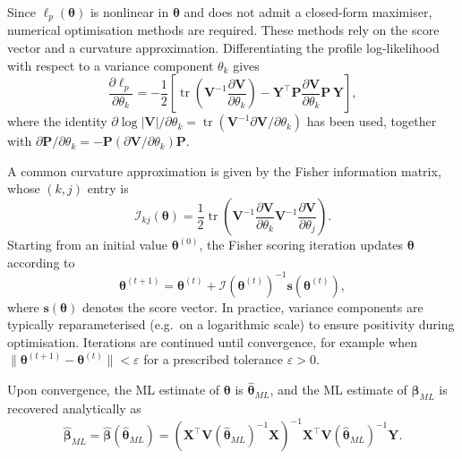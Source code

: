 \documentclass[
  letterpaper,
  DIV=11,
  numbers=noendperiod]{scrartcl}
\begin{document}
Since \(\ell_p(\symbf{\theta})\) is nonlinear in \(\symbf{\theta}\) and
does not admit a closed-form maximiser, numerical optimisation methods
are required. These methods rely on the score vector and a curvature
approximation. Differentiating the profile log-likelihood with respect
to a variance component \(\theta_k\) gives \begin{equation}
\frac{\partial \ell_p}{\partial \theta_k}
=
-\frac{1}{2}\left[
\operatorname{tr}\!\left(
\symbf{V}^{-1}\frac{\partial \symbf{V}}{\partial \theta_k}
\right)
-
\symbf{Y}^\top \symbf{P}
\frac{\partial \symbf{V}}{\partial \theta_k}
\symbf{P}\,\symbf{Y}
\right],
\end{equation} where the identity
\(\partial \log|\symbf{V}|/\partial \theta_k
=
\operatorname{tr}(\symbf{V}^{-1}\partial \symbf{V}/\partial \theta_k)\)
has been used, together with \(\partial \symbf{P}/\partial \theta_k
=
-\symbf{P}(\partial \symbf{V}/\partial \theta_k)\symbf{P}\).

A common curvature approximation is given by the Fisher information
matrix, whose \((k,j)\) entry is \begin{equation}
\mathcal{I}_{kj}(\symbf{\theta})
=
\frac{1}{2}\operatorname{tr}\!\left(
\symbf{V}^{-1}\frac{\partial\symbf{V}}{\partial\theta_k}
\symbf{V}^{-1}\frac{\partial\symbf{V}}{\partial\theta_j}
\right).
\end{equation} Starting from an initial value \(\symbf{\theta}^{(0)}\),
the Fisher scoring iteration updates \(\symbf{\theta}\) according to
\begin{equation}
\symbf{\theta}^{(t+1)}
=
\symbf{\theta}^{(t)}
+
\mathcal{I}\!\left(\symbf{\theta}^{(t)}\right)^{-1}
\symbf{s}\!\left(\symbf{\theta}^{(t)}\right),
\end{equation} where \(\symbf{s}(\symbf{\theta})\) denotes the score
vector. In practice, variance components are typically reparameterised
(e.g.~on a logarithmic scale) to ensure positivity during optimisation.
Iterations are continued until convergence, for example when
\(\|\symbf{\theta}^{(t+1)} - \symbf{\theta}^{(t)}\| < \varepsilon\) for
a prescribed tolerance \(\varepsilon > 0\).

Upon convergence, the ML estimate of \(\symbf{\theta}\) is
\(\widehat{\symbf{\theta}}_{ML}\), and the ML estimate of
\(\symbf{\beta}_{ML}\) is recovered analytically as \begin{equation}
    \widehat{\symbf{\beta}}_{ML}
    = \widehat{\symbf{\beta}}\!\left(\widehat{\symbf{\theta}}_{ML}\right)
    =
    \left(
        \symbf{X}^\top
        \symbf{V}(\widehat{\symbf{\theta}}_{ML})^{-1}
        \symbf{X}
    \right)^{-1}
    \symbf{X}^\top
    \symbf{V}(\widehat{\symbf{\theta}}_{ML})^{-1}
    \symbf{Y}.
\end{equation}
\end{document}
